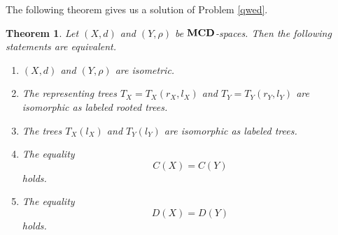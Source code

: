 \documentclass{raex}
\newtheorem{thm}{Theorem}[section]
\theoremstyle{definition}
\theoremstyle{remark}
\numberwithin{equation}{section}
\begin{document}
The following theorem gives us a solution of Problem \ref{qwed}.

\begin{thm}\label{m0}
Let $(X,d)$ and $(Y,\rho)$ be $\bf MCD$-spaces.
Then the following statements are equivalent.
\begin{enumerate}
\item $(X,d)$ and $(Y,\rho)$ are isometric.

\item The representing trees
\(
T_X=T_X(r_X,l_X)
\) and
\(T_Y=T_Y(r_Y,l_Y)
\)
are isomorphic as labeled rooted trees.

\item The trees $T_X(l_X)$ and $T_Y(l_Y)$ are isomorphic as labeled trees.

\item The equality
\begin{equation}
    \label{m2}
C(X)=C(Y)
\end{equation}
holds.

\item The equality
\begin{equation*}
D(X)=D(Y)
\end{equation*}
holds.
\end{enumerate}
\end{thm}
\end{document}
